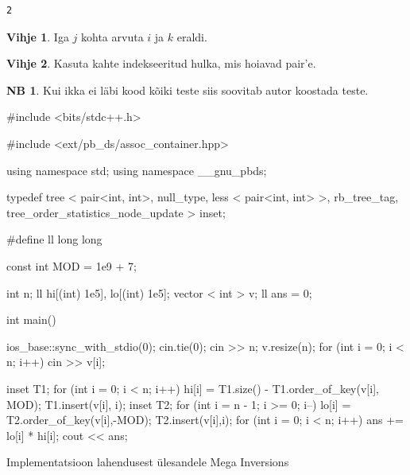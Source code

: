 \documentclass{trkut}
\theoremstyle{definition}
\newtheorem*{extra}{NB}
\newtheorem*{vihje}{Vihje}
\begin{document}
\begin{verbatim}
2
\end{verbatim}



\begin{vihje}
Iga $j$ kohta arvuta $i$ ja $k$ eraldi.
\end{vihje}
\begin{vihje}
Kasuta kahte indekseeritud hulka, mis hoiavad pair'e.
\end{vihje}
\begin{extra}
Kui ikka ei läbi kood kõiki teste siis soovitab autor koostada teste.
\end{extra}

\begin{cclol}
#include <bits/stdc++.h>

#include <ext/pb_ds/assoc_container.hpp>

using namespace std;
using namespace __gnu_pbds;

typedef tree < pair<int, int>, null_type, less < pair<int, int> >, 
rb_tree_tag, tree_order_statistics_node_update > inset;

#define ll long long

const int MOD = 1e9 + 7;

int n;
ll hi[(int) 1e5], lo[(int) 1e5];
vector < int > v;
ll ans = 0;

int main() {
  ios_base::sync_with_stdio(0);
  cin.tie(0);
  cin >> n;
  v.resize(n);
  for (int i = 0; i < n; i++) cin >> v[i];

  inset T1;
  for (int i = 0; i < n; i++) {
    hi[i] = T1.size() - T1.order_of_key({v[i], MOD});
    T1.insert({v[i], i});
  }
  inset T2;
  for (int i = n - 1; i >= 0; i--) {
    lo[i] = T2.order_of_key({v[i],-MOD});
    T2.insert({v[i],i});
  }
  for (int i = 0; i < n; i++) ans += lo[i] * hi[i];
  cout << ans;
}
\end{cclol}
\begin{kk}[H]%
    \caption{Implementatsioon lahendusest ülesandele Mega Inversions}%
    \label{EMaxx}%
    \end{kk}
\end{document}
